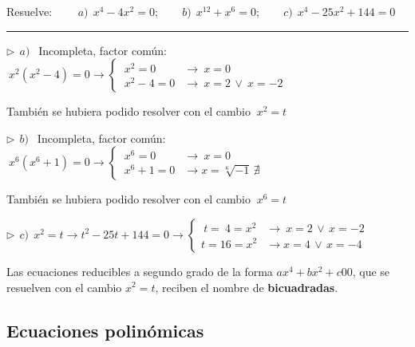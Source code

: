 \begin{miejercicio}

Resuelve: $\qquad a)\ \ x^4-4x^2=0;\qquad b)\ \ x^{12}+x^6=0; \qquad c) \ \ x^4-25x^2+144=0$	

\rule{250pt}{0.1pt}

\vspace{2mm} $\triangleright \ \ a)\ \ $ Incompleta, factor común: $\ x^2(x^2-4)=0 \to \begin{cases} \ x^2=0 & \to \ x=0 \\ \ x^2-4=0 & \to \ x=2\, \vee \ x=-2 \end{cases}$

\vspace{2mm} También se hubiera podido resolver con el cambio $\ x^2=t$

\vspace{5mm} $\triangleright \ \ b)\ \ $ Incompleta, factor común: $\ x^6(x^6+1)=0 \to \begin{cases} \ x^6=0 & \to \ x=0  \\ \ x^6+1=0 & \to x=\sqrt[6]{-1}\, \nexists \end{cases}$

\vspace{2mm} También se hubiera podido resolver con el cambio $\ x^6=t$

\vspace{5mm} $\triangleright \ \ c)\ \ x^2=t \to t^2-25t+144 = 0 \to \begin{cases} \ t=\ 4=x^2 & \to \ x=2 \, \vee \, x=-2 \\ t=16=x^2 & \to x=4 \, \vee \, x=-4  \end{cases}$
\end{miejercicio}

\vspace{5mm}

Las ecuaciones reducibles a segundo grado de la forma $ax^4+bx^2+c00$, que se resuelven con el cambio $x^2=t$, reciben el nombre de \textbf{bicuadradas}.



\vspace{0.5cm}
\subsection{Ecuaciones polinómicas}
\vspace{0.5cm}


